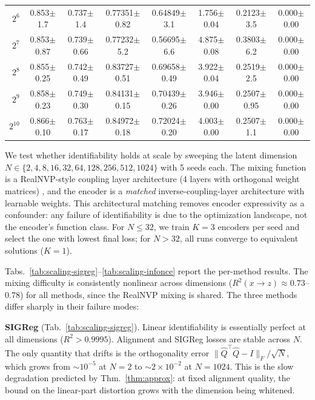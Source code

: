 \begin{table}[t]
{\begin{tabular}{r cc cc c cc}
  $2^{6}$ & 0.853\tiny{$\pm$1.7} & 0.737\tiny{$\pm$1.4} & 0.77351\tiny{$\pm$0.82} & 0.64849\tiny{$\pm$3.1} & 1.756\tiny{$\pm$0.04} & 0.2123\tiny{$\pm$3.5} & 0.000\tiny{$\pm$0.00} \\
  $2^{7}$ & 0.853\tiny{$\pm$0.87} & 0.739\tiny{$\pm$0.66} & 0.77232\tiny{$\pm$5.2} & 0.56695\tiny{$\pm$6.6} & 4.875\tiny{$\pm$0.08} & 0.3803\tiny{$\pm$6.2} & 0.000\tiny{$\pm$0.00} \\
  $2^{8}$ & 0.855\tiny{$\pm$0.25} & 0.742\tiny{$\pm$0.49} & 0.83727\tiny{$\pm$0.51} & 0.69658\tiny{$\pm$0.49} & 3.922\tiny{$\pm$0.04} & 0.2519\tiny{$\pm$2.5} & 0.000\tiny{$\pm$0.00} \\
  $2^{9}$ & 0.858\tiny{$\pm$0.23} & 0.749\tiny{$\pm$0.30} & 0.84131\tiny{$\pm$0.15} & 0.70439\tiny{$\pm$0.26} & 3.946\tiny{$\pm$0.00} & 0.2507\tiny{$\pm$0.95} & 0.000\tiny{$\pm$0.00} \\
  $2^{10}$ & 0.866\tiny{$\pm$0.10} & 0.763\tiny{$\pm$0.17} & 0.84972\tiny{$\pm$0.18} & 0.72024\tiny{$\pm$0.20} & 4.003\tiny{$\pm$0.00} & 0.2507\tiny{$\pm$1.1} & 0.000\tiny{$\pm$0.00} \\
\bottomrule
\end{tabular}}
\end{table}


We test whether identifiability holds at scale by sweeping the latent dimension $N \in \{2, 4, 8, 16, 32, 64, 128, 256, 512, 1024\}$ with 5 seeds each.
The mixing function is a RealNVP-style coupling layer architecture (4 layers with orthogonal weight matrices) \citep{dinh2016density}, and the encoder is a \emph{matched} inverse-coupling-layer architecture with learnable weights.
This architectural matching removes encoder expressivity as a confounder: any failure of identifiability is due to the optimization landscape, not the encoder's function class.
For $N \leq 32$, we train $K=3$ encoders per seed and select the one with lowest final loss; for $N > 32$, all runs converge to equivalent solutions ($K=1$).

Tabs.~\ref{tab:scaling-sigreg}--\ref{tab:scaling-infonce} report the per-method results. The mixing difficulty is consistently nonlinear across dimensions ($R^2(x \to z) \approx 0.73$--$0.78$) for all methods, since the RealNVP mixing is shared. The three methods differ sharply in their failure modes:

\textbf{SIGReg} (Tab.~\ref{tab:scaling-sigreg}). Linear identifiability is essentially perfect at all dimensions ($R^2 > 0.9995$). Alignment and SIGReg losses are stable across $N$. The only quantity that drifts is the orthogonality error $\|\hat Q^\top \hat Q - I\|_F / \sqrt{N}$, which grows from $\sim 10^{-5}$ at $N{=}2$ to $\sim 2 \times 10^{-2}$ at $N{=}1024$. This is the slow degradation predicted by Thm.~\ref{thm:approx}: at fixed alignment quality, the bound on the linear-part distortion grows with the dimension being whitened.


